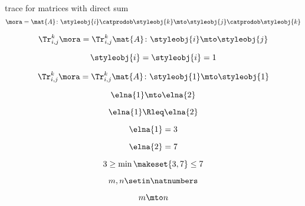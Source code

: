 \begin{forslides}
    trace for matrices with direct sum
    \begin{equation}
        \label{eq:feedback-006}
        \mora = \mat{A} \colon \styleobj{i} \catprodob \styleobj{k} \mto \styleobj{j} \catprodob \styleobj{k}
    \end{equation}

    \begin{equation}
        \label{eq:feedback-007}
        \Tr_{i,j}^{k} \mora = \Tr_{i,j}^{k} \mat{A} \colon \styleobj{i} \mto \styleobj{j}
    \end{equation}

    \begin{equation}
        \label{eq:feedback-008}
        \styleobj{i} = \styleobj{i} = 1
    \end{equation}

    \begin{equation}
        \label{eq:feedback-009}
        \Tr_{i,j}^{k} \mora = \Tr_{i,j}^{k} \mat{A} \colon \styleobj{1} \mto \styleobj{1}
    \end{equation}

    \begin{equation}
        \label{eq:feedback-010}
        \elna{1} \mto \elna{2}
    \end{equation}

    \begin{equation}
        \label{eq:feedback-011}
        \elna{1}\Rleq \elna{2}
    \end{equation}

    \begin{equation}
        \label{eq:feedback-012}
        \elna{1} = 3
    \end{equation}

    \begin{equation}
        \label{eq:feedback-013}
        \elna{2} = 7
    \end{equation}

    \begin{equation}
        \label{eq:feedback-014}
        3 \geq \min \makeset{3, 7} \leq 7
    \end{equation}

    \begin{equation}
        \label{eq:feedback-015}
        m, n \setin \natnumbers
    \end{equation}

    \begin{equation}
        \label{eq:feedback-016}
        m \mto n
    \end{equation}


\end{forslides}
